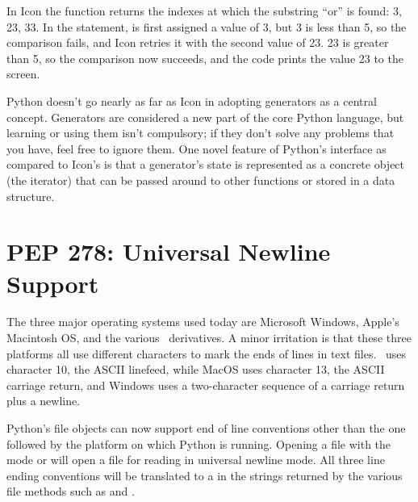 \documentclass{howto}
\begin{document}
In Icon the  function returns the indexes at which the
substring ``or'' is found: 3, 23, 33.  In the  statement,
 is first assigned a value of 3, but 3 is less than 5, so the
comparison fails, and Icon retries it with the second value of 23.  23
is greater than 5, so the comparison now succeeds, and the code prints
the value 23 to the screen.

Python doesn't go nearly as far as Icon in adopting generators as a
central concept.  Generators are considered a new part of the core
Python language, but learning or using them isn't compulsory; if they
don't solve any problems that you have, feel free to ignore them.
One novel feature of Python's interface as compared to
Icon's is that a generator's state is represented as a concrete object
(the iterator) that can be passed around to other functions or stored
in a data structure.

\begin{seealso}


\end{seealso}


\section{PEP 278: Universal Newline Support}

The three major operating systems used today are Microsoft Windows,
Apple's Macintosh OS, and the various \UNIX\ derivatives.  A minor
irritation is that these three platforms all use different characters
to mark the ends of lines in text files.  \UNIX\ uses character 10,
the ASCII linefeed, while MacOS uses character 13, the ASCII carriage
return, and Windows uses a two-character sequence of a carriage return
plus a newline.

Python's file objects can now support end of line conventions other
than the one followed by the platform on which Python is running.
Opening a file with the mode  or  will open a file
for reading in universal newline mode.  All three line ending
conventions will be translated to a  in the strings
returned by the various file methods such as  and
. 
\end{document}
